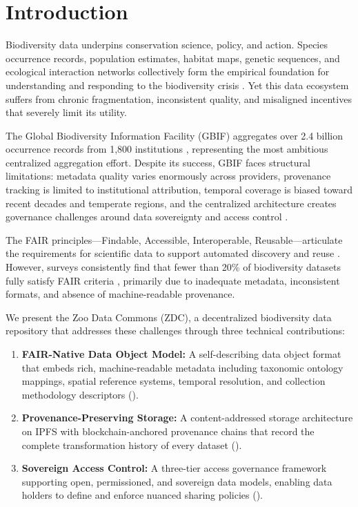 \section{Introduction}

\label{sec:introduction}

Biodiversity data underpins conservation science, policy, and action.
Species occurrence records, population estimates, habitat maps, genetic sequences, and ecological interaction networks collectively form the empirical foundation for understanding and responding to the biodiversity crisis \citep{diaz2019global}.
Yet this data ecosystem suffers from chronic fragmentation, inconsistent quality, and misaligned incentives that severely limit its utility.

The Global Biodiversity Information Facility (GBIF) aggregates over 2.4 billion occurrence records from 1,800 institutions \citep{gbif2024overview}, representing the most ambitious centralized aggregation effort.
Despite its success, GBIF faces structural limitations: metadata quality varies enormously across providers, provenance tracking is limited to institutional attribution, temporal coverage is biased toward recent decades and temperate regions, and the centralized architecture creates governance challenges around data sovereignty and access control \citep{yesson2007how}.

The FAIR principles---Findable, Accessible, Interoperable, Reusable---articulate the requirements for scientific data to support automated discovery and reuse \citep{wilkinson2016fair}.
However, surveys consistently find that fewer than 20\% of biodiversity datasets fully satisfy FAIR criteria \citep{jacobsen2020fair}, primarily due to inadequate metadata, inconsistent formats, and absence of machine-readable provenance.

We present the Zoo Data Commons (ZDC), a decentralized biodiversity data repository that addresses these challenges through three technical contributions:

\begin{enumerate}[leftmargin=*]
    \item \textbf{FAIR-Native Data Object Model:} A self-describing data object format that embeds rich, machine-readable metadata including taxonomic ontology mappings, spatial reference systems, temporal resolution, and collection methodology descriptors ().
    \item \textbf{Provenance-Preserving Storage:} A content-addressed storage architecture on IPFS with blockchain-anchored provenance chains that record the complete transformation history of every dataset ().
    \item \textbf{Sovereign Access Control:} A three-tier access governance framework supporting open, permissioned, and sovereign data models, enabling data holders to define and enforce nuanced sharing policies ().
\end{enumerate}

